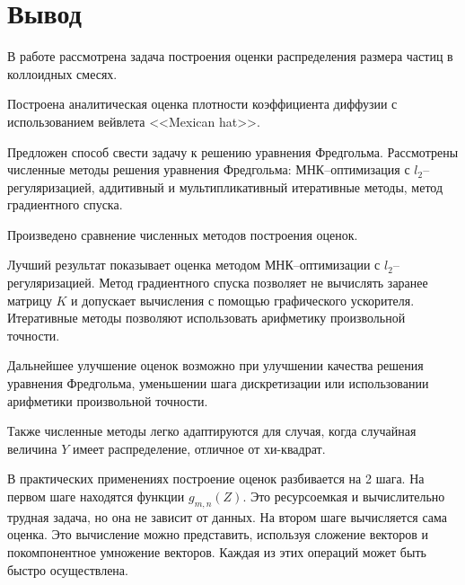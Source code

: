 \documentclass[../paper.tex]{subfiles}
\begin{document}
\section{Вывод}
В работе рассмотрена задача построения оценки распределения размера частиц в коллоидных смесях.

Построена аналитическая оценка плотности коэффициента диффузии с использованием вейвлета <<Mexican hat>>.

Предложен способ свести задачу к решению уравнения Фредгольма.
Рассмотрены численные методы решения уравнения Фредгольма: МНК--опти\-ми\-зация с $l_2$--регуляризацией,
аддитивный и мультипликативный итеративные методы, метод градиентного спуска.

Произведено сравнение численных методов построения оценок.

Лучший результат показывает оценка методом МНК--оптимизации с $l_2$--регу\-ляризацией.
Метод градиентного спуска позволяет не вычислять заранее матрицу $K$ и допускает вычисления с помощью графического ускорителя.
Итеративные методы позволяют использовать арифметику произвольной точности.

Дальнейшее улучшение оценок возможно при улучшении качества решения уравнения Фредгольма, уменьшении шага дискретизации или
использовании арифметики произвольной точности.

Также численные методы легко адаптируются для случая, когда случайная величина $Y$ имеет распределение, отличное от хи-квадрат.

В практических применениях построение оценок разбивается на 2 шага. На первом шаге находятся функции $g_{m,n}(Z)$. Это ресурсоемкая и вычислительно трудная задача,
но она не зависит от данных. На втором шаге вычисляется сама оценка. Это вычисление можно представить, используя сложение векторов и покомпонентное умножение векторов.
Каждая из этих операций может быть быстро осуществлена.
\end{document}
